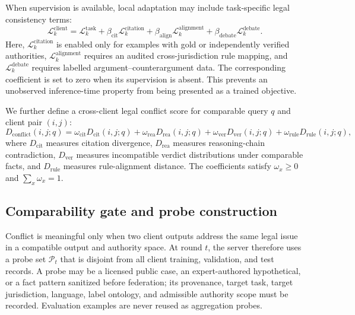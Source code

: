 \documentclass[preprint,12pt,authoryear]{elsarticle}
\newcommand{\loss}{\mathcal{L}}
\begin{document}
When supervision is available, local adaptation may include task-specific legal consistency terms:
\begin{equation}
    \loss^{\mathrm{client}}_k =
    \loss^{\mathrm{task}}_k
    + \beta_{\mathrm{cit}}\loss^{\mathrm{citation}}_k
    + \beta_{\mathrm{align}}\loss^{\mathrm{alignment}}_k
    + \beta_{\mathrm{debate}}\loss^{\mathrm{debate}}_k .
\end{equation}
Here, $\loss^{\mathrm{citation}}_k$ is enabled only for examples with gold or independently verified authorities, $\loss^{\mathrm{alignment}}_k$ requires an audited cross-jurisdiction rule mapping, and $\loss^{\mathrm{debate}}_k$ requires labelled argument--counterargument data. The corresponding coefficient is set to zero when its supervision is absent. This prevents an unobserved inference-time property from being presented as a trained objective.

We further define a cross-client legal conflict score for comparable query $q$ and client pair $(i,j)$:
\begin{equation}
    D_{\mathrm{conflict}}(i,j;q) =
    \omega_{\mathrm{cit}}D_{\mathrm{cit}}(i,j;q)
    + \omega_{\mathrm{rea}}D_{\mathrm{rea}}(i,j;q)
    + \omega_{\mathrm{ver}}D_{\mathrm{ver}}(i,j;q)
    + \omega_{\mathrm{rule}}D_{\mathrm{rule}}(i,j;q),
\end{equation}
where $D_{\mathrm{cit}}$ measures citation divergence, $D_{\mathrm{rea}}$ measures reasoning-chain contradiction, $D_{\mathrm{ver}}$ measures incompatible verdict distributions under comparable facts, and $D_{\mathrm{rule}}$ measures rule-alignment distance.
The coefficients satisfy $\omega_x\geq 0$ and $\sum_x \omega_x=1$.

\subsection{Comparability gate and probe construction}

Conflict is meaningful only when two client outputs address the same legal issue in a compatible output and authority space. At round $t$, the server therefore uses a probe set $\mathcal{P}_t$ that is disjoint from all client training, validation, and test records. A probe may be a licensed public case, an expert-authored hypothetical, or a fact pattern sanitized before federation; its provenance, target task, target jurisdiction, language, label ontology, and admissible authority scope must be recorded. Evaluation examples are never reused as aggregation probes.
\end{document}
